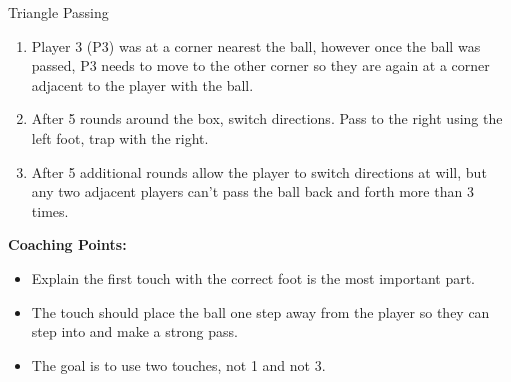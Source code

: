 \begin{evenBlock}{Triangle Passing}
\begin{minipage}[t]{\linewidth}
\begin{minipage}{.6\linewidth}
\begin{enumerate}
            \item  Player 3 (P3) was at a corner nearest the ball, however once the ball was passed, P3 needs to move to the other corner so they are again at a corner adjacent to the player with the ball.
            \item After 5 rounds around the box, switch directions.  Pass to the right using the left foot, trap with the right.
            \item After 5 additional rounds allow the player to switch directions at will, but any two adjacent players can't pass the ball back and forth more than 3 times.
        \end{enumerate}
    \end{minipage}
\end{minipage}
\raggedright
    \textbf{Coaching Points:}
    \begin{itemize}
        \setlength{\itemsep}{0pt}
        \setlength{\parskip}{0pt}
        \setlength{\parsep}{0pt}
        \item Explain the first touch with the correct foot is the most important part.
        \item The touch should place the ball one step away from the player so they can step into and make a strong pass.
        \item The goal is to use two touches, not 1 and not 3.
    \end{itemize}

\end{evenBlock}